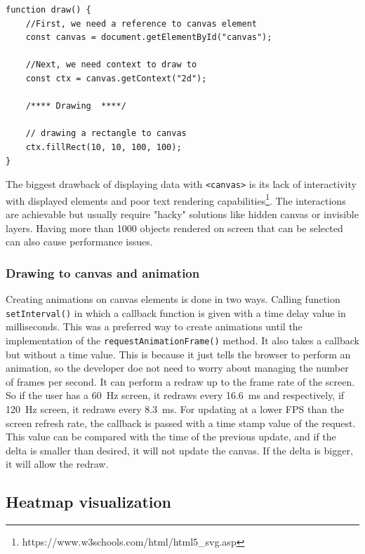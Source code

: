 \begin{lstlisting}[frame=single,numbers=right,caption={An example implementation of drawing to canvas.},label=lst:canvas.example,basicstyle=\ttfamily\small, keywordstyle=\color{black}\bfseries\underbar,]
function draw() {
    //First, we need a reference to canvas element
    const canvas = document.getElementById("canvas");

    //Next, we need context to draw to
    const ctx = canvas.getContext("2d");

    /**** Drawing  ****/
    
    // drawing a rectangle to canvas
    ctx.fillRect(10, 10, 100, 100);
}
\end{lstlisting}

The biggest drawback of displaying data with \verb|<canvas>| is its lack of interactivity with displayed elements and poor text rendering capabilities\footnote{https://www.w3schools.com/html/html5\_svg.asp}. The interactions are achievable but usually require "hacky" solutions like hidden canvas or invisible layers. Having more than 1000 objects rendered on screen that can be selected can also cause performance issues. 


\subsubsection{Drawing to canvas and animation}

Creating animations on canvas elements is done in two ways. Calling function \verb|setInterval()| in which a callback function is given with a time delay value in milliseconds. This was a preferred way to create animations until the implementation of the \verb|requestAnimationFrame()| method. It also takes a callback but without a time value. This is because it just tells the browser to perform an animation, so the developer doe not need to worry about managing the number of frames per second. It can perform a redraw up to the frame rate of the screen. So if the user has a \qty{60}{Hz} screen, it redraws every \qty{16.6}{ms} and respectively, if \qty{120}{Hz} screen, it redraws every \qty{8.3}{ms}. For updating at a lower FPS than the screen refresh rate, the callback is passed with a time stamp value of the request. This value can be compared with the time of the previous update, and if the delta is smaller than desired, it will not update the canvas. If the delta is bigger, it will allow the redraw.

\subsection{Heatmap visualization}\label{txt.design.frontend.heatmap}

